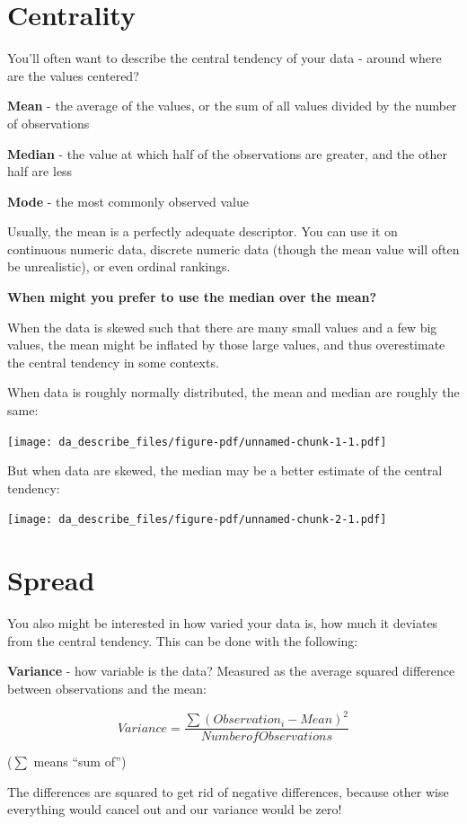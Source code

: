 \documentclass[
  letterpaper,
  DIV=11,
  numbers=noendperiod]{scrreprt}
\begin{document}
\section{Centrality}\label{centrality}

You'll often want to describe the central tendency of your data - around
where are the values centered?

\textbf{Mean} - the average of the values, or the sum of all values
divided by the number of observations

\textbf{Median} - the value at which half of the observations are
greater, and the other half are less

\textbf{Mode} - the most commonly observed value

Usually, the mean is a perfectly adequate descriptor. You can use it on
continuous numeric data, discrete numeric data (though the mean value
will often be unrealistic), or even ordinal rankings.

\textbf{When might you prefer to use the median over the mean?}

When the data is skewed such that there are many small values and a few
big values, the mean might be inflated by those large values, and thus
overestimate the central tendency in some contexts.

When data is roughly normally distributed, the mean and median are
roughly the same:

\texttt{[image: da\_describe\_files/figure-pdf/unnamed-chunk-1-1.pdf]}

But when data are skewed, the median may be a better estimate of the
central tendency:

\texttt{[image: da\_describe\_files/figure-pdf/unnamed-chunk-2-1.pdf]}

\section{Spread}\label{spread}

You also might be interested in how varied your data is, how much it
deviates from the central tendency. This can be done with the following:

\textbf{Variance} - how variable is the data? Measured as the average
squared difference between observations and the mean:

\[
Variance = \frac{\sum (Observation_i - Mean)^2}{Number of Observations}
\]

(\(\sum\) means ``sum of'')

The differences are squared to get rid of negative differences, because
other wise everything would cancel out and our variance would be zero!
\end{document}

